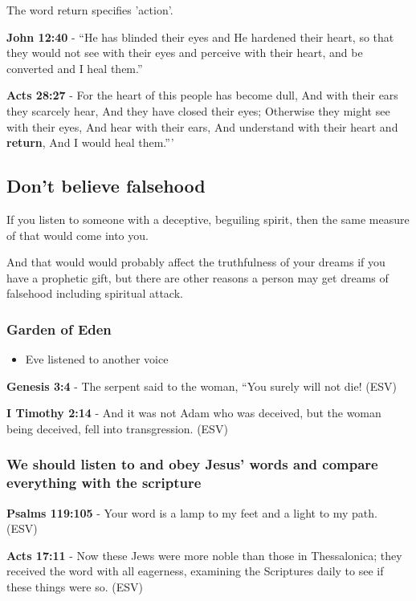 \documentclass[11pt]{article}
\begin{document}
The word return specifies 'action'.

\textbf{John 12:40} - “He has blinded their eyes and He hardened their heart, so that they would not see with their eyes and perceive with their heart, and be converted and I heal them.”

\textbf{Acts 28:27} - For the heart of this people has become dull, And with their ears they scarcely hear, And they have closed their eyes; Otherwise they might see with their eyes, And hear with their ears, And understand with their heart and \textbf{return}, And I would heal them.”’

\subsection{Don't believe falsehood}
\label{sec:orgb553370}
If you listen to someone with a deceptive, beguiling spirit, then the same measure of that would come into you.

And that would would probably affect the truthfulness of your dreams if you have a prophetic gift, but there are other reasons a person may get dreams of falsehood including spiritual attack.

\subsubsection{Garden of Eden}
\label{sec:org22c57cb}
\begin{itemize}
\item Eve listened to another voice
\end{itemize}

\textbf{Genesis 3:4} - The serpent said to the woman, “You surely will not die! (ESV)

\textbf{I Timothy 2:14} - And it was not Adam who was deceived, but the woman being deceived, fell into transgression. (ESV)

\subsubsection{We should listen to and obey Jesus' words and compare everything with the scripture}
\label{sec:orgcd8fb70}

\textbf{Psalms 119:105} - Your word is a lamp to my feet and a light to my path. (ESV)

\textbf{Acts 17:11} - Now these Jews were more noble than those in Thessalonica; they received the word with all eagerness, examining the Scriptures daily to see if these things were so. (ESV)
\end{document}
